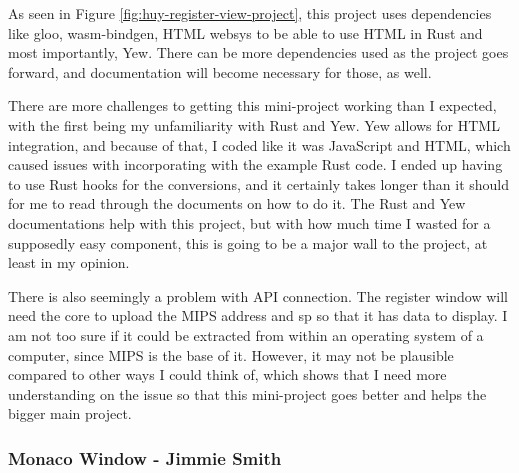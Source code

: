 \documentclass[
    paper=letter,
    parskip=half,
    fontsize=12pt,
    titlepage=firstiscover,
    toc=bibliography,
    numbers=endperiod
]{scrartcl}
\begin{document}
As seen in Figure \ref{fig:huy-register-view-project}, this project uses
dependencies like gloo, wasm-bindgen, HTML websys to be able to use HTML
in Rust and most importantly, Yew. There can be more dependencies used
as the project goes forward, and documentation will become necessary for
those, as well.

There are more challenges to getting this mini-project working than I
expected, with the first being my unfamiliarity with Rust and Yew. Yew
allows for HTML integration, and because of that, I coded like it was
JavaScript and HTML, which caused issues with incorporating with the
example Rust code. I ended up having to use Rust hooks for the
conversions, and it certainly takes longer than it should for me to read
through the documents on how to do it. The Rust and Yew documentations
help with this project, but with how much time I wasted for a supposedly
easy component, this is going to be a major wall to the project, at
least in my opinion.


There is also seemingly a problem with API connection. The register
window will need the core to upload the MIPS address and sp so that it
has data to display. I am not too sure if it could be extracted from
within an operating system of a computer, since MIPS is the base of it.
However, it may not be plausible compared to other ways I could think
of, which shows that I need more understanding on the issue so that this
mini-project goes better and helps the bigger main project.

\subsubsection{Monaco Window - Jimmie Smith}
\end{document}
